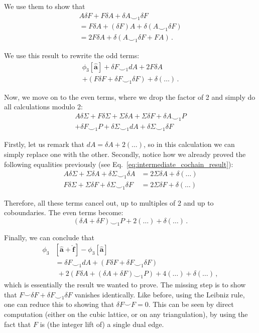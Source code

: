 \documentclass[aps,twocolumn,prx,floatfix,preprintnumbers, nofootinbib,10pt]{revtex4-2}
\numberwithin{equation}{section}
\theoremstyle{definition}
\theoremstyle{remark}
\theoremstyle{claim}
\newcommand{\be}{\begin{equation}}
\newcommand{\ee}{\end{equation}}
\newcommand{\paren}[1]{\left( #1 \right)}
\begin{document}
We use them to show that
\begin{multline}\label{eq:intermediate_cochain_result}
 A \delta F + F \delta A + \delta A \smile_1 \delta F \\
 = F \delta A + (\delta F) A + \delta (A \smile_1 \delta F) \\
 = 2 F \delta A + \delta (A \smile_1 \delta F + FA) \,.
\end{multline}

We use this result to rewrite the odd terms:
\begin{multline}
 \phi_3[\bm{\hat{a}}] + \delta F \smile_1 dA + 2 F \delta A \\
 + \paren{F \delta F + \delta F \smile_1 \delta F} + \delta (\dots) \,.
\end{multline}

Now, we move on to the even terms, where we drop the factor of 2 and simply do all calculations modulo 2:
\begin{multline}
 A \delta \Sigma + F \delta \Sigma + \Sigma \delta A + \Sigma \delta F + \delta A \smile_1 P \\
 + \delta F \smile_1 P + \delta \Sigma \smile_1 dA + \delta \Sigma \smile_1 \delta F
\end{multline}

Firstly, let us remark that $dA = \delta A + 2 (\dots)$, so in this calculation we can simply replace one with the other. Secondly, notice how we already proved the following equalities previously (see Eq.~\eqref{eq:intermediate_cochain_result}):
\begin{align}
 A \delta \Sigma + \Sigma \delta A + \delta \Sigma \smile_1 \delta A &= 2 \Sigma \delta A + \delta (\dots) \\
 F \delta \Sigma + \Sigma \delta F + \delta \Sigma \smile_1 \delta F &= 2 \Sigma \delta F + \delta (\dots)
\end{align}

Therefore, all these terms cancel out, up to multiples of 2 and up to coboundaries. The even terms become:
\be
(\delta A + \delta F) \smile_1 P + 2(\dots) + \delta(\dots) \,.
\ee

Finally, we can conclude that
\begin{align}
 \phi_3&[\bm{\hat{a}} + \bm{\hat{f}}] - \phi_3[\bm{\hat{a}}] \nonumber \\
 &= \delta F \smile_1 dA + \paren{F \delta F + \delta F \smile_1 \delta F} \nonumber \\
 &\; + 2 \paren{F \delta A + \paren{\delta A + \delta F} \smile_1 P} + 4 (\dots) + \delta (\dots) \,,
\end{align}
which is essentially the result we wanted to prove. The missing step is to show that $F \smile \delta F + \delta F \smile_1 \delta F$ vanishes identically. Like before, using the Leibniz rule, one can reduce this to showing that $\delta F \smile F = 0$. This can be seen by direct computation (either on the cubic lattice, or on any triangulation), by using the fact that $F$ is (the integer lift of) a single dual edge.
\end{document}
